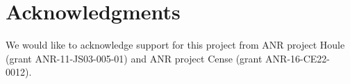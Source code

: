\documentclass[natbib,smallextended]{svjour3}
\begin{document}
\section{Acknowledgments}
We would like to acknowledge support for this project
from ANR project Houle (grant ANR-11-JS03-005-01) and ANR project Cense (grant ANR-16-CE22-0012).







%
%
%

%
%
\end{document}
